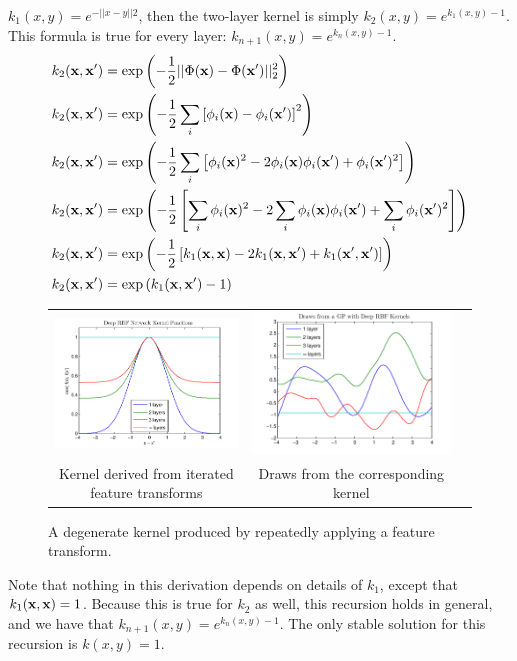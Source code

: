 \documentclass{article}
\begin{document}
$k_1(x,y) = e^{-||x - y||2}$, then the two-layer kernel is simply $k_2(x,y) = e^{k_1(x, y) - 1}$.  This formula is true for every layer: $k_{n+1}(x,y) = e^{k_n(x, y) - 1}$.
%
\begin{align}
k_2({\bf{x}}, {\bf{x}}') & = \exp \left( -\frac{1}{2} || \Phi({\bf{x}}) - \Phi({\bf{x}}')||_2^2 \right) \\
k_2({\bf{x}}, {\bf{x}}') & = \exp \left( -\frac{1}{2} \sum_i \left[ \phi_i({\bf{x}}) - \phi_i({\bf{x}}') \right]^2 \right) \\
k_2({\bf{x}}, {\bf{x}}') & = \exp\left ( -\frac{1}{2} \sum_i \left[ \phi_i({\bf{x}})^2 - 2 \phi_i({\bf{x}}) \phi_i({\bf{x}}') + \phi_i({\bf{x}}')^2 \right] \right) \\
k_2({\bf{x}}, {\bf{x}}') & = \exp \left( -\frac{1}{2} \left[ \sum_i \phi_i({\bf{x}})^2 - 2 \sum_i \phi_i({\bf{x}}) \phi_i({\bf{x}}') + \sum_i \phi_i({\bf{x}}')^2 \right] \right) \\
k_2({\bf{x}}, {\bf{x}}') & = \exp \left( -\frac{1}{2} \left[ k_1({\bf{x}}, {\bf{x}}) - 2 k_1({\bf{x}}, {\bf{x}}') + k_1({\bf{x}}', {\bf{x}}') \right] \right) \\
k_2({\bf{x}}, {\bf{x}}') & = \exp \left( k_1({\bf{x}}, {\bf{x}}') - 1 \right)
\end{align}
%
\begin{figure}
\centering
\begin{tabular}{ccc}
\includegraphics[width=0.5\columnwidth, clip, trim = 0cm 0cm 0cm 0.61cm]{figures/deep_kernel} &
\includegraphics[width=0.5\columnwidth, clip, trim = 0cm 0cm 0cm 0.61cm]{figures/deep_kernel_draws} \\
Kernel derived from iterated feature transforms & Draws from the corresponding kernel
\end{tabular}
\caption{A degenerate kernel produced by repeatedly applying a feature transform.}
\label{fig:deep_kernel}
\end{figure}
%
Note that nothing in this derivation depends on details of $k_1$, except that $k_1( {\bf{x}}, {\bf{x}}) = 1$.  Because this is true for $k_2$ as well, this recursion holds in general, and we have that $k_{n+1}(x,y) = e^{k_n(x, y) - 1}$.  The only stable solution for this recursion is $k(x,y) = 1$.
\end{document}
